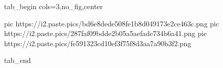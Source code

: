  
 
 
 
 


\ifcmt
  tab_begin cols=3,no_fig,center

     pic https://i2.paste.pics/bd6e8dede508fe1b8d049173e2ce463c.png
		 pic https://i2.paste.pics/287faf09bdde2b05a5aefade734b6a41.png
		 pic https://i2.paste.pics/fe591323cd10ef3f75f8d3aa7a90b3f2.png

  tab_end
\fi
